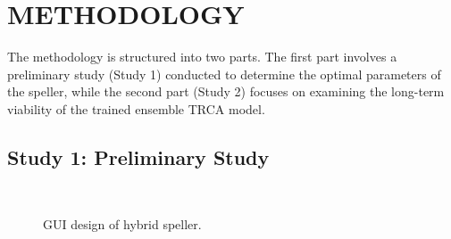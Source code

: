 \setlength{\footskip}{8mm}

\chapter{METHODOLOGY}

The methodology is structured into two parts. The first part involves a preliminary study (Study 1) conducted to determine the optimal parameters of the speller, while the second part (Study 2) focuses on examining the long-term viability of the trained ensemble TRCA model.

\section{Study 1: Preliminary Study}

\begin{figure}[h]
    \centering
    \caption{GUI design of hybrid speller.}
    \label{fig:speller-layout}
    \hfill
    \\
    \hfill
\end{figure}

